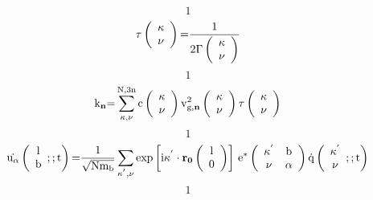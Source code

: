 \documentclass{article}
\begin{document}
\[1\] 
\[\tau \left( \begin{array}{c}
{\mathbf \kappa } \\ 
\nu  \end{array}
\right){\rm =}\frac{{\rm 1}}{{\rm 2}\Gamma \left( \begin{array}{c}
{\mathbf \kappa } \\ 
\nu  \end{array}
\right)}\] 
\[1\] 
\[{{\rm k}}_{{\mathbf n}}{\rm =}\sum^{{\rm N,3n}}_{{\mathbf \kappa }{\rm ,}\nu }{{\rm c}\left( \begin{array}{c}
{\mathbf \kappa } \\ 
\nu  \end{array}
\right){{\rm v}}^{{\rm 2}}_{{\rm g,}{\mathbf n}}\left( \begin{array}{c}
{\mathbf \kappa } \\ 
\nu  \end{array}
\right)\tau \left( \begin{array}{c}
{\mathbf \kappa } \\ 
\nu  \end{array}
\right)}\] 
\[1\] 
\[\dot{{{\rm u}}_{\alpha }}\left( \begin{array}{c}
{\rm l} \\ 
{\rm b} \end{array}
;;{\rm t}\right){\rm =}\frac{{\rm 1}}{\sqrt{{\rm N}{{\rm m}}_{{\rm b}}}}\sum_{{{\mathbf \kappa }}^{{\mathbf '}}{\rm ,}\nu }{{\exp  \left[{\rm i}{{\mathbf \kappa }}^{{\mathbf '}}\cdot {{\mathbf r}}_{{\mathbf 0}}\left( \begin{array}{c}
{\rm l} \\ 
0 \end{array}
\right)\right]\ }{{\rm e}}^{{\rm *}}\left( \begin{array}{cc}
{{\mathbf \kappa }}^{{\mathbf '}} & {\rm b} \\ 
\nu  & \alpha  \end{array}
\right)\dot{{\rm q}}\left( \begin{array}{c}
{{\mathbf \kappa }}^{{\mathbf '}} \\ 
\nu  \end{array}
;;{\rm t}\right)}\] 
\[1\] 
\end{document}
